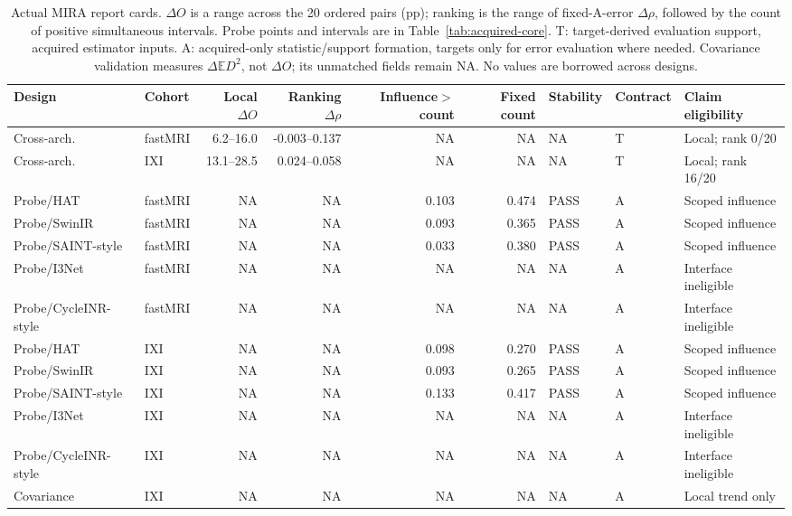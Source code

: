 \begin{table}[t]\centering\scriptsize
\caption{Actual MIRA report cards. $\Delta O$ is a range across the 20 ordered pairs (pp); ranking is the range of fixed-A-error $\Delta\rho$, followed by the count of positive simultaneous intervals. Probe points and intervals are in Table~\ref{tab:acquired-core}. T: target-derived evaluation support, acquired estimator inputs. A: acquired-only statistic/support formation, targets only for error evaluation where needed. Covariance validation measures $\Delta\mathbb E D^2$, not $\Delta O$; its unmatched fields remain NA. No values are borrowed across designs.}
\label{tab:mira-card}\setlength{\tabcolsep}{3pt}
\begin{tabular}{llrrr rlll}\toprule
Design & Cohort & Local $\Delta O$ & Ranking $\Delta\rho$ & Influence$>$count & Fixed count & Stability & Contract & Claim eligibility\\\midrule
Cross-arch. & fastMRI & 6.2--16.0 & -0.003--0.137 & NA & NA & NA & T & Local; rank 0/20 \\
Cross-arch. & IXI & 13.1--28.5 & 0.024--0.058 & NA & NA & NA & T & Local; rank 16/20 \\
Probe/HAT & fastMRI & NA & NA & 0.103 & 0.474 & PASS & A & Scoped influence \\
Probe/SwinIR & fastMRI & NA & NA & 0.093 & 0.365 & PASS & A & Scoped influence \\
Probe/SAINT-style & fastMRI & NA & NA & 0.033 & 0.380 & PASS & A & Scoped influence \\
Probe/I3Net & fastMRI & NA & NA & NA & NA & NA & A & Interface ineligible \\
Probe/CycleINR-style & fastMRI & NA & NA & NA & NA & NA & A & Interface ineligible \\
Probe/HAT & IXI & NA & NA & 0.098 & 0.270 & PASS & A & Scoped influence \\
Probe/SwinIR & IXI & NA & NA & 0.093 & 0.265 & PASS & A & Scoped influence \\
Probe/SAINT-style & IXI & NA & NA & 0.133 & 0.417 & PASS & A & Scoped influence \\
Probe/I3Net & IXI & NA & NA & NA & NA & NA & A & Interface ineligible \\
Probe/CycleINR-style & IXI & NA & NA & NA & NA & NA & A & Interface ineligible \\
Covariance & IXI & NA & NA & NA & NA & NA & A & Local trend only \\\bottomrule\end{tabular}\end{table}
